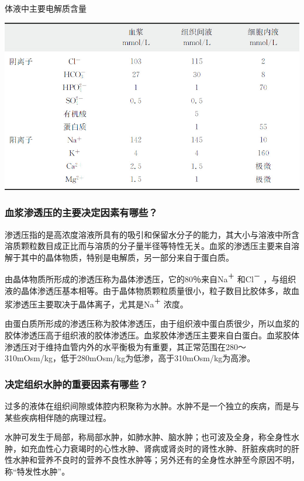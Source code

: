 \begin{table}[htbp]
\centering
\caption{体液中主要电解质含量}
\label{tab19-1}
\includegraphics{./images/Image00159.jpg}
\end{table}

\subsubsection{血浆渗透压的主要决定因素有哪些？}

渗透压指的是高浓度溶液所具有的吸引和保留水分子的能力，其大小与溶液中所含溶质颗粒数目成正比而与溶质的分子量半径等特性无关。血浆的渗透压主要来自溶解于其中的晶体物质，特别是电解质，另一部分来自于蛋白质。

由晶体物质所形成的渗透压称为晶体渗透压，它的80％来自Na\textsuperscript{＋}
和Cl\textsuperscript{－}
，与组织液的晶体渗透压基本相等。由于晶体物质颗粒质量很小，粒子数目比胶体多，故血浆渗透压主要取决于晶体离子，尤其是Na\textsuperscript{＋}
浓度。

由蛋白质所形成的渗透压称为胶体渗透压，由于组织液中蛋白质很少，所以血浆的胶体渗透压高于组织液的胶体渗透压。血浆胶体渗透压主要来自白蛋白。血浆胶体渗透压对于维持血管内外的水平衡极为有重要，其正常范围在280～310mOsm/kg，低于280mOsm/kg为低渗，高于310mOsm/kg为高渗。

\subsubsection{决定组织水肿的重要因素有哪些？}

过多的液体在组织间隙或体腔内积聚称为水肿。水肿不是一个独立的疾病，而是与某些疾病相伴随的病理过程。

水肿可发生于局部，称局部水肿，如肺水肿、脑水肿；也可波及全身，称全身性水肿，如充血性心力衰竭时的心性水肿、肾病或肾炎时的肾性水肿、肝脏疾病时的肝性水肿和营养不良时的营养不良性水肿等；另外还有的全身性水肿至今原因不明，称“特发性水肿”。

